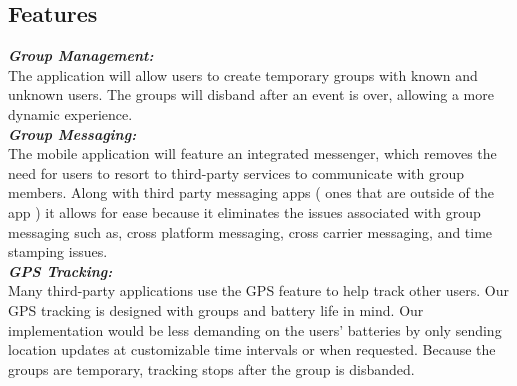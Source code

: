 \subsection{Features}

\textit{\textbf{Group Management:}}\\

The application will allow users to create temporary groups with known and unknown users. The groups will disband after an event is over, allowing a more dynamic experience. \\

\noindent
\textit{\textbf{Group Messaging:}} \\

The mobile application will feature an integrated messenger, which removes the need for users to resort to third-party services to communicate with group members. Along with third party messaging apps ( ones that are outside of the app ) it allows for ease because it eliminates the issues associated with group messaging such as, cross platform messaging, cross carrier messaging, and time stamping issues. \\

\noindent
\textit{\textbf{GPS Tracking:}}\\

Many third-party applications use the GPS feature to help track other users. Our GPS tracking is designed with groups and battery life in mind. Our implementation would be less demanding on the users’ batteries by only sending location updates at customizable time intervals or when requested. Because the groups are temporary, tracking stops after the group is disbanded. \\






